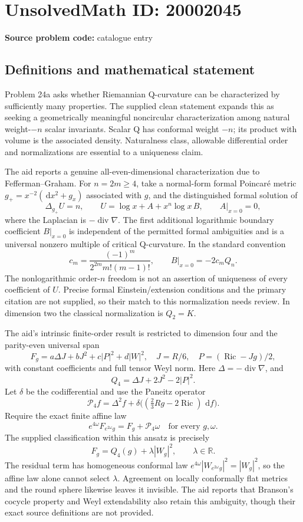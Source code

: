 \documentclass[11pt]{article}
\newcommand{\R}{\mathbb{R}}
\newcommand{\dd}{\,\mathrm{d}}
\begin{document}
\section*{UnsolvedMath ID: 20002045}
\textbf{Source problem code:} catalogue entry
\subsection{Definitions and mathematical statement}
Problem 24a asks whether Riemannian Q-curvature can be characterized by sufficiently many properties. The supplied clean statement expands this as seeking a geometrically meaningful noncircular characterization among natural weight-\(-n\) scalar invariants. Scalar Q has conformal weight \(-n\); its product with volume is the associated density. Naturalness class, allowable differential order and normalizations are essential to a uniqueness claim.

The aid reports a genuine all-even-dimensional characterization due to Fefferman--Graham. For \(n=2m\geq4\), take a normal-form formal Poincaré metric \(g_+=x^{-2}(\dd x^2+g_x)\) associated with \(g\), and the distinguished formal solution of
\[
 \Delta_{g_+}U=n,
 \qquad U=\log x+A+x^n\log x\,B,
 \qquad A|_{x=0}=0,
\]
where the Laplacian is \(-\operatorname{div}\nabla\). The first additional logarithmic boundary coefficient \(B|_{x=0}\) is independent of the permitted formal ambiguities and is a universal nonzero multiple of critical Q-curvature. In the standard convention
\[
 c_m=\frac{(-1)^m}{2^{2m}m!(m-1)!},\qquad
 B|_{x=0}=-2c_mQ_n.
\]
The nonlogarithmic order-\(n\) freedom is not an assertion of uniqueness of every coefficient of \(U\). Precise formal Einstein/extension conditions and the primary citation are not supplied, so their match to this normalization needs review. In dimension two the classical normalization is \(Q_2=K\).

The aid's intrinsic finite-order result is restricted to dimension four and the parity-even universal span
\[
 F_g=a\Delta J+bJ^2+c|P|^2+d|W|^2,
 \quad J=R/6,\quad P=(\operatorname{Ric}-Jg)/2,
\]
with constant coefficients and full tensor Weyl norm. Here \(\Delta=-\operatorname{div}\nabla\), and
\[
 Q_4=\Delta J+2J^2-2|P|^2.
\]
Let \(\delta\) be the codifferential and use the Paneitz operator
\[
 \mathcal P_4f=\Delta^2f+
 \delta\big((\tfrac23R g-2\operatorname{Ric})\,\dd f\big).
\]
Require the exact finite affine law
\[
 e^{4\omega}F_{e^{2\omega}g}=F_g+\mathcal P_4\omega
 \quad\text{for every }g,\omega.
\]
The supplied classification within this ansatz is precisely
\[
 F_g=Q_4(g)+\lambda|W_g|^2,\qquad\lambda\in\R.
\]
The residual term has homogeneous conformal law
\(e^{4\omega}|W_{e^{2\omega}g}|^2=|W_g|^2\), so the affine law alone cannot select \(\lambda\). Agreement on locally conformally flat metrics and the round sphere likewise leaves it invisible. The aid reports that Branson's cocycle property and Weyl extendability also retain this ambiguity, though their exact source definitions are not provided.
\end{document}
